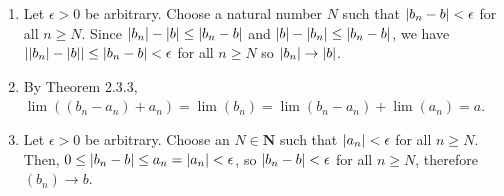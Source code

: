 \documentclass{article}
\DeclarePairedDelimiter\abs{\lvert}{\rvert}
\newcommand{\N}{\mathbf{N}}
\begin{document}
\begin{enumerate}
\begin{enumerate}
		\item Let $\epsilon > 0$ be arbitrary. Choose a natural number $N$ such that $\abs*{b_n - b} < \epsilon$ for all $n \geq N$. Since $\abs*{b_n} - \abs*{b} \leq \abs*{b_n - b}$ and $\abs*{b} - \abs*{b_n} \leq \abs*{b_n - b}$, we have $\abs*{\abs*{b_n}-\abs*{b}} \leq \abs*{b_n-b} < \epsilon$ for all $n \geq N$ so $\abs*{b_n} \rightarrow \abs*{b}$.
		      		      		      	     
		\item By Theorem 2.3.3, $\lim ((b_n-a_n) + a_n) = \lim(b_n) = \lim (b_n - a_n) + \lim(a_n) = a$.
		      		      		      	     
		\item Let $\epsilon > 0$ be arbitrary. Choose an $N \in \N$ such that $\abs*{a_n} < \epsilon$ for all $n \geq N$. Then, $0 \leq \abs*{b_n-b} \leq a_n = \abs*{a_n} < \epsilon$, so $\abs*{b_n - b} < \epsilon$ for all $n \geq N$, therefore $(b_n) \rightarrow b$.
	\end{enumerate}
				 

\end{enumerate}
\end{document}
